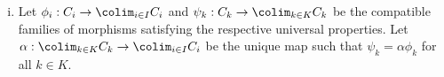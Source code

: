 \documentclass{article}
\begin{document}
 \begin{enumerate}[i.]
\item Let $\phi_i: C_i \to \colim_{i \in I} C_i$ and $\psi_k: C_k \to \colim_{k \in K} C_k$ be the compatible families of morphisms satisfying the respective universal properties. Let $\alpha: \colim_{k \in K} C_k \to \colim_{i \in I} C_i$ be the unique map such that $\psi_k = \alpha \phi_k$ for all $k \in K$.


\end{enumerate}
\end{document}
